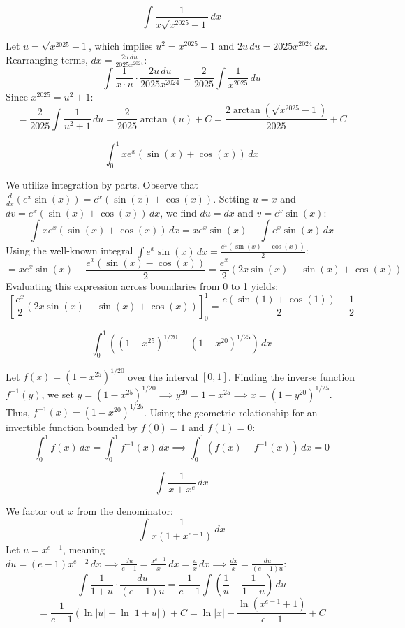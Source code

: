 \begin{questions}
    \question 
    \[ \int \frac{1}{x\sqrt{x^{2025}-1}} \, dx \]
    \begin{solution}
        Let $u = \sqrt{x^{2025}-1}$, which implies $u^2 = x^{2025}-1$ and $2u \, du = 2025 x^{2024} \, dx$. Rearranging terms, $dx = \frac{2u \, du}{2025 x^{2024}}$:
        \[ \int \frac{1}{x \cdot u} \cdot \frac{2u \, du}{2025 x^{2024}} = \frac{2}{2025} \int \frac{1}{x^{2025}} \, du \]
        Since $x^{2025} = u^2+1$:
        \[ = \frac{2}{2025} \int \frac{1}{u^2+1} \, du = \frac{2}{2025}\arctan(u) + C = \frac{2\arctan\left(\sqrt{x^{2025}-1}\right)}{2025} + C \]
    \end{solution}

    \question 
    \[ \int_{0}^{1} xe^{x}(\sin(x)+\cos(x)) \, dx \]
    \begin{solution}
        We utilize integration by parts. Observe that $\frac{d}{dx}(e^x\sin(x)) = e^x(\sin(x)+\cos(x))$. Setting $u = x$ and $dv = e^x(\sin(x)+\cos(x)) \, dx$, we find $du = dx$ and $v = e^x\sin(x)$:
        \[ \int x e^x(\sin(x)+\cos(x)) \, dx = xe^x\sin(x) - \int e^x\sin(x) \, dx \]
        Using the well-known integral $\int e^x\sin(x) \, dx = \frac{e^x(\sin(x)-\cos(x))}{2}$:
        \[ = xe^x\sin(x) - \frac{e^x(\sin(x)-\cos(x))}{2} = \frac{e^x}{2}\left(2x\sin(x) - \sin(x) + \cos(x)\right) \]
        Evaluating this expression across boundaries from 0 to 1 yields:
        \[ \left[\frac{e^x}{2}(2x\sin(x) - \sin(x) + \cos(x))\right]_0^1 = \frac{e(\sin(1)+\cos(1))}{2} - \frac{1}{2} \]
    \end{solution}

    \question 
    \[ \int_{0}^{1} \left((1-x^{25})^{1/20}-(1-x^{20})^{1/25}\right) \, dx \]
    \begin{solution}
        Let $f(x) = (1-x^{25})^{1/20}$ over the interval $[0,1]$. Finding the inverse function $f^{-1}(y)$, we set $y = (1-x^{25})^{1/20} \implies y^{20} = 1-x^{25} \implies x = (1-y^{20})^{1/25}$. Thus, $f^{-1}(x) = (1-x^{20})^{1/25}$.
        Using the geometric relationship for an invertible function bounded by $f(0)=1$ and $f(1)=0$:
        \[ \int_{0}^{1} f(x) \, dx = \int_{0}^{1} f^{-1}(x) \, dx \implies \int_{0}^{1} \left(f(x) - f^{-1}(x)\right) \, dx = 0 \]
    \end{solution}

    \question 
    \[ \int \frac{1}{x+x^{e}} \, dx \]
    \begin{solution}
        We factor out $x$ from the denominator:
        \[ \int \frac{1}{x(1+x^{e-1})} \, dx \]
        Let $u = x^{e-1}$, meaning $du = (e-1)x^{e-2} \, dx \implies \frac{du}{e-1} = \frac{x^{e-1}}{x} \, dx = \frac{u}{x} \, dx \implies \frac{dx}{x} = \frac{du}{(e-1)u}$:
        \[ \int \frac{1}{1+u} \cdot \frac{du}{(e-1)u} = \frac{1}{e-1} \int \left( \frac{1}{u} - \frac{1}{1+u} \right) \, du \]
        \[ = \frac{1}{e-1}(\ln|u| - \ln|1+u|) + C = \ln|x| - \frac{\ln(x^{e-1}+1)}{e-1} + C \]
    \end{solution}


\end{questions}
